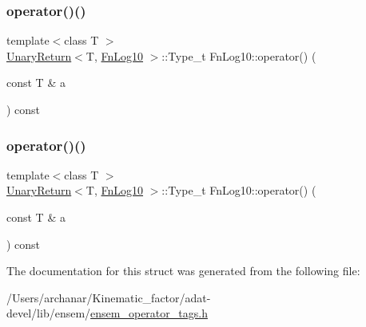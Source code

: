 \mbox{\label{structFnLog10_a1548f8a24a8e8897062608f1825e0c11}} 
\subsubsection{\texorpdfstring{operator()()}{operator()()}\hspace{0.1cm}{\footnotesize\ttfamily [2/3]}}
{\footnotesize\ttfamily template$<$class T $>$ \\
\mbox{\hyperlink{structUnaryReturn}{Unary\+Return}}$<$T, \mbox{\hyperlink{structFnLog10}{Fn\+Log10}} $>$\+::Type\+\_\+t Fn\+Log10\+::operator() (\begin{DoxyParamCaption}\item[{const T \&}]{a }\end{DoxyParamCaption}) const\hspace{0.3cm}{\ttfamily [inline]}}

\mbox{\label{structFnLog10_a1548f8a24a8e8897062608f1825e0c11}} 
\subsubsection{\texorpdfstring{operator()()}{operator()()}\hspace{0.1cm}{\footnotesize\ttfamily [3/3]}}
{\footnotesize\ttfamily template$<$class T $>$ \\
\mbox{\hyperlink{structUnaryReturn}{Unary\+Return}}$<$T, \mbox{\hyperlink{structFnLog10}{Fn\+Log10}} $>$\+::Type\+\_\+t Fn\+Log10\+::operator() (\begin{DoxyParamCaption}\item[{const T \&}]{a }\end{DoxyParamCaption}) const\hspace{0.3cm}{\ttfamily [inline]}}



The documentation for this struct was generated from the following file\+:\begin{DoxyCompactItemize}
\item 
/\+Users/archanar/\+Kinematic\+\_\+factor/adat-\/devel/lib/ensem/\mbox{\hyperlink{adat-devel_2lib_2ensem_2ensem__operator__tags_8h}{ensem\+\_\+operator\+\_\+tags.\+h}}\end{DoxyCompactItemize}
